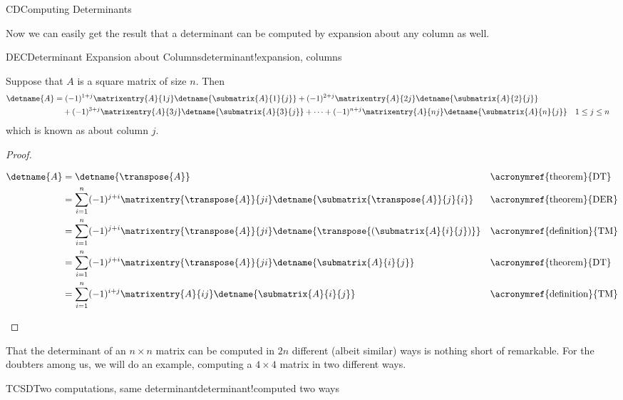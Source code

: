 \begin{subsect}{CD}{Computing Determinants}
%
\begin{para}Now we can easily get the result that a determinant can be computed by expansion about any column as well.\end{para}
%
\begin{theorem}{DEC}{Determinant Expansion about Columns}{determinant!expansion, columns}
\begin{para}Suppose that $A$ is a square matrix of size $n$.  Then
%
\begin{align*}
\detname{A}&=
(-1)^{1+j}\matrixentry{A}{1j}\detname{\submatrix{A}{1}{j}}+
(-1)^{2+j}\matrixentry{A}{2j}\detname{\submatrix{A}{2}{j}}\\
&\quad+(-1)^{3+j}\matrixentry{A}{3j}\detname{\submatrix{A}{3}{j}}+
\cdots+
(-1)^{n+j}\matrixentry{A}{nj}\detname{\submatrix{A}{n}{j}}
&&
1\leq j\leq n
%
\end{align*}
%
which is known as  about column $j$.\end{para}
%
\end{theorem}
%
\begin{proof}
%
\begin{para}
\begin{align*}
\detname{A}
&=
\detname{\transpose{A}}&&\text{\acronymref{theorem}{DT}}\\
%
&=
\sum_{i=1}^{n}(-1)^{j+i}\matrixentry{\transpose{A}}{ji}\detname{\submatrix{\transpose{A}}{j}{i}}
&&\text{\acronymref{theorem}{DER}}\\
%
&=
\sum_{i=1}^{n}(-1)^{j+i}\matrixentry{\transpose{A}}{ji}\detname{\transpose{\left(\submatrix{A}{i}{j}\right)}}
&&\text{\acronymref{definition}{TM}}\\
%
&=
\sum_{i=1}^{n}(-1)^{j+i}\matrixentry{\transpose{A}}{ji}\detname{\submatrix{A}{i}{j}}
&&\text{\acronymref{theorem}{DT}}\\
%
&=
\sum_{i=1}^{n}(-1)^{i+j}\matrixentry{A}{ij}\detname{\submatrix{A}{i}{j}}
&&\text{\acronymref{definition}{TM}}
%
\end{align*}
\end{para}
%
\end{proof}
%
\begin{para}That the determinant of an $n\times n$ matrix can be computed in $2n$ different (albeit similar) ways is nothing short of remarkable.  For the doubters among us, we will do an example, computing a $4\times 4$ matrix in two different ways.\end{para}
%
\begin{example}{TCSD}{Two computations, same determinant}{determinant!computed two ways}

\end{example}
\end{subsect}
